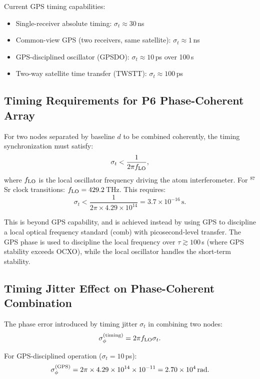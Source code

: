\documentclass[11pt]{article}
\theoremstyle{definition}
\theoremstyle{remark}
\begin{document}
Current GPS timing capabilities:
\begin{itemize}
\item Single-receiver absolute timing: $\sigma_t \approx 30$\,ns
\item Common-view GPS (two receivers, same satellite): $\sigma_t \approx 1$\,ns
\item GPS-disciplined oscillator (GPSDO): $\sigma_t \approx 10$\,ps over 100\,s
\item Two-way satellite time transfer (TWSTT): $\sigma_t \approx 100$\,ps
\end{itemize}

\subsection{Timing Requirements for P6 Phase-Coherent Array}

For two nodes separated by baseline $d$ to be combined coherently,
the timing synchronization must satisfy:
\begin{equation}
\sigma_t < \frac{1}{2\pi f_{\rm LO}},
\label{eq:timing-req}
\end{equation}
where $f_{\rm LO}$ is the local oscillator frequency driving the atom
interferometer. For $^{87}$Sr clock transitions: $f_{\rm LO} = 429.2$\,THz.
This requires:
\begin{equation}
\sigma_t < \frac{1}{2\pi \times 4.29\times10^{14}} = 3.7\times10^{-16}\,\mathrm{s}.
\end{equation}

This is beyond GPS capability, and is achieved instead by using GPS to
discipline a local optical frequency standard (comb) with picosecond-level
transfer. The GPS phase is used to discipline the local frequency over
$\tau \gtrsim 100$\,s (where GPS stability exceeds OCXO), while the local
oscillator handles the short-term stability.

\subsection{Timing Jitter Effect on Phase-Coherent Combination}

The phase error introduced by timing jitter $\sigma_t$ in combining two
nodes:
\begin{equation}
\sigma_\phi^{(\rm timing)} = 2\pi f_{\rm LO} \sigma_t.
\end{equation}

For GPS-disciplined operation ($\sigma_t = 10$\,ps):
\begin{equation}
\sigma_\phi^{(\rm GPS)} = 2\pi \times 4.29\times10^{14} \times 10^{-11}
= 2.70\times10^4\,\mathrm{rad}.
\end{equation}
\end{document}
